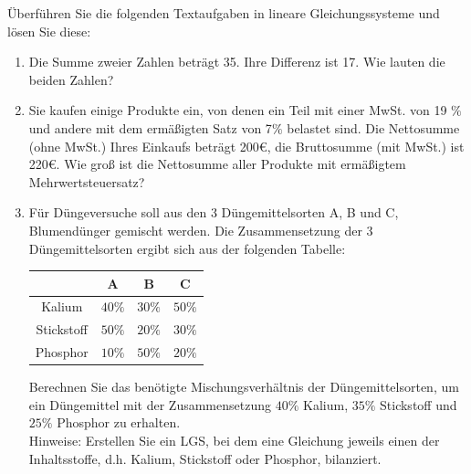 \begin{ExerciseBlock}
Überführen Sie die folgenden Textaufgaben in lineare Gleichungssysteme und lösen Sie diese:
\begin{enumerate}[label=\alph*)]
	
	\item Die Summe zweier Zahlen beträgt 35. Ihre Differenz ist 17. Wie lauten die beiden Zahlen? 
	
	\item Sie kaufen einige Produkte ein, von denen ein Teil mit einer MwSt. von 19 $\%$ und andere mit dem ermä\ss igten Satz von  7$\%$ belastet sind. Die Nettosumme (ohne MwSt.) Ihres Einkaufs beträgt 200€, die Bruttosumme (mit MwSt.) ist 220€. Wie groß ist die Nettosumme aller Produkte mit ermä\ss igtem Mehrwertsteuersatz?
	
	\item Für Düngeversuche soll aus den 3 Düngemittelsorten A, B und C, Blumendünger gemischt werden. Die Zusammensetzung der 3 Düngemittelsorten ergibt sich aus der folgenden Tabelle:
	
	\begin{center}
	\begin{tabular}{c c c c} 
	 & A & B & C \\ 
	\hline 
	Kalium     & $40\%$ & $30\%$ & $50\%$ \\
	Stickstoff & $50\%$ & $20\%$ & $30\%$ \\
	Phosphor   & $10\%$ & $50\%$ & $20\%$
	\end{tabular}
	\end{center}
	Berechnen Sie das benötigte Mischungsverhältnis der Düngemittelsorten, um ein Düngemittel mit der Zusammensetzung $40\%$ Kalium, $35\%$ Stickstoff und $25\%$ Phosphor zu erhalten. \\
	Hinweise: Erstellen Sie ein LGS, bei dem eine Gleichung jeweils einen der Inhaltsstoffe, d.h. Kalium, Stickstoff oder Phosphor, bilanziert.
	
\end{enumerate}

\end{ExerciseBlock}
